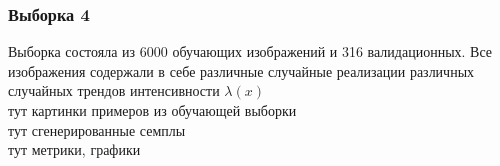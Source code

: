 		\subsubsection{Выборка 4}
			Выборка состояла из 6000 обучающих изображений и 316 валидационных. Все изображения содержали в себе различные случайные реализации различных случайных трендов интенсивности $\lambda(x)$ \\
			тут картинки примеров из обучающей выборки \\
			тут сгенерированные семплы \\
			тут метрики, графики
